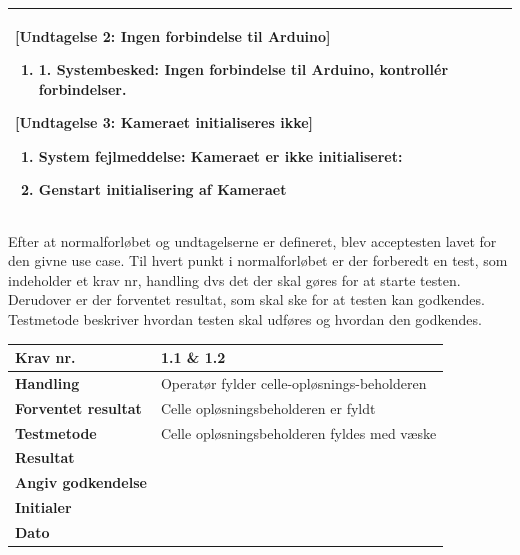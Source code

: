 \begin{center}
\begin{longtable}{ | m{4cm} | m{8cm}| }
			[Undtagelse 2: Ingen forbindelse til Arduino]
			
			\begin{enumerate}
			\item 1.	Systembesked: Ingen forbindelse til Arduino, kontrollér forbindelser.
			\end{enumerate} 
	
			[Undtagelse 3: Kameraet initialiseres ikke]
			
			\begin{enumerate}
			\item System fejlmeddelse: Kameraet er ikke initialiseret:
			\item Genstart initialisering af Kameraet
			\end{enumerate} \\
			\hline
		\end{longtable}
	\end{center}

Efter at normalforløbet og undtagelserne er defineret, blev acceptesten lavet for den givne use case. Til hvert punkt i normalforløbet er der forberedt en test, som indeholder et krav nr, handling dvs det der skal gøres for at starte testen. Derudover er der forventet resultat, som skal ske for at testen kan godkendes. Testmetode beskriver hvordan testen skal udføres og hvordan den godkendes.

\begin{center}
		\begin{longtable}{ | m{4cm}| m{8.5cm}|} 
			\hline
			\textbf{Krav nr.} & 1.1 \& 1.2    \\ 
			\hline
			\textbf{Handling} &  Operatør fylder celle-opløsnings-beholderen   \\
			\hline
			\textbf{Forventet resultat} &  Celle opløsningsbeholderen er fyldt  \\
			\hline
			\textbf{Testmetode}  &  Celle opløsningsbeholderen fyldes med væske  \\
			\hline
			\textbf{Resultat}  &    \\
			\hline
			\textbf{Angiv godkendelse} &     \\
			\hline
			\textbf{Initialer} &     \\
			\hline
			\textbf{Dato} &    \\
			\hline
		\end{longtable}
	\end{center}
	

